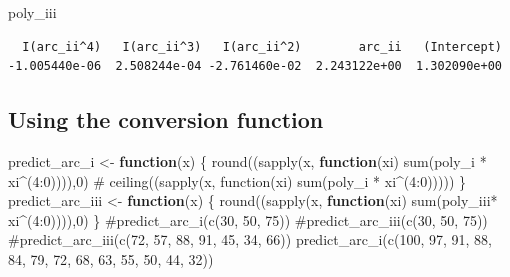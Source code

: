 \documentclass[
  letterpaper,
  DIV=11,
  numbers=noendperiod]{scrartcl}
\newenvironment{Shaded}{\begin{snugshade}}{\end{snugshade}}
\newcommand{\CommentTok}[1]{\textcolor[rgb]{0.37,0.37,0.37}{#1}}
\newcommand{\ControlFlowTok}[1]{\textcolor[rgb]{0.00,0.23,0.31}{\textbf{#1}}}
\newcommand{\DecValTok}[1]{\textcolor[rgb]{0.68,0.00,0.00}{#1}}
\newcommand{\FunctionTok}[1]{\textcolor[rgb]{0.28,0.35,0.67}{#1}}
\newcommand{\NormalTok}[1]{\textcolor[rgb]{0.00,0.23,0.31}{#1}}
\newcommand{\OtherTok}[1]{\textcolor[rgb]{0.00,0.23,0.31}{#1}}
\newcommand{\SpecialCharTok}[1]{\textcolor[rgb]{0.37,0.37,0.37}{#1}}
\begin{document}
\begin{Shaded}
\begin{Highlighting}[]
\NormalTok{poly\_iii}
\end{Highlighting}
\end{Shaded}

\begin{verbatim}
  I(arc_ii^4)   I(arc_ii^3)   I(arc_ii^2)        arc_ii   (Intercept) 
-1.005440e-06  2.508244e-04 -2.761460e-02  2.243122e+00  1.302090e+00 
\end{verbatim}

\subsection{Using the conversion
function}\label{using-the-conversion-function}

\begin{Shaded}
\begin{Highlighting}[]
\NormalTok{predict\_arc\_i }\OtherTok{\textless{}{-}} \ControlFlowTok{function}\NormalTok{(x) \{}
  \FunctionTok{round}\NormalTok{((}\FunctionTok{sapply}\NormalTok{(x, }\ControlFlowTok{function}\NormalTok{(xi) }\FunctionTok{sum}\NormalTok{(poly\_i }\SpecialCharTok{*}\NormalTok{ xi}\SpecialCharTok{\^{}}\NormalTok{(}\DecValTok{4}\SpecialCharTok{:}\DecValTok{0}\NormalTok{)))),}\DecValTok{0}\NormalTok{)}
\CommentTok{\#  ceiling((sapply(x, function(xi) sum(poly\_i * xi\^{}(4:0)))))}
\NormalTok{\}}
\NormalTok{predict\_arc\_iii }\OtherTok{\textless{}{-}} \ControlFlowTok{function}\NormalTok{(x) \{}
  \FunctionTok{round}\NormalTok{((}\FunctionTok{sapply}\NormalTok{(x, }\ControlFlowTok{function}\NormalTok{(xi) }\FunctionTok{sum}\NormalTok{(poly\_iii}\SpecialCharTok{*}\NormalTok{ xi}\SpecialCharTok{\^{}}\NormalTok{(}\DecValTok{4}\SpecialCharTok{:}\DecValTok{0}\NormalTok{)))),}\DecValTok{0}\NormalTok{)}
\NormalTok{\}}
\CommentTok{\#predict\_arc\_i(c(30, 50, 75))}
\CommentTok{\#predict\_arc\_iii(c(30, 50, 75))}
\CommentTok{\#predict\_arc\_iii(c(72, 57, 88, 91, 45, 34, 66))}
\FunctionTok{predict\_arc\_i}\NormalTok{(}\FunctionTok{c}\NormalTok{(}\DecValTok{100}\NormalTok{, }\DecValTok{97}\NormalTok{, }\DecValTok{91}\NormalTok{, }\DecValTok{88}\NormalTok{, }\DecValTok{84}\NormalTok{, }\DecValTok{79}\NormalTok{, }\DecValTok{72}\NormalTok{, }\DecValTok{68}\NormalTok{, }\DecValTok{63}\NormalTok{, }\DecValTok{55}\NormalTok{, }\DecValTok{50}\NormalTok{, }\DecValTok{44}\NormalTok{, }\DecValTok{32}\NormalTok{))}
\end{Highlighting}
\end{Shaded}
\end{document}

